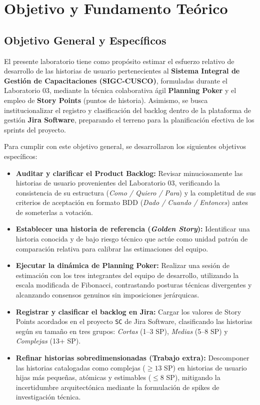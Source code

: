 \section{Objetivo y Fundamento Teórico}

\subsection{Objetivo General y Específicos}

El presente laboratorio tiene como propósito estimar el esfuerzo relativo de desarrollo de las historias de usuario pertenecientes al \textbf{Sistema Integral de Gestión de Capacitaciones (SIGC-CUSCO)}, formuladas durante el Laboratorio 03, mediante la técnica colaborativa ágil \textbf{Planning Poker} y el empleo de \textbf{Story Points} (puntos de historia). Asimismo, se busca institucionalizar el registro y clasificación del backlog dentro de la plataforma de gestión \textbf{Jira Software}, preparando el terreno para la planificación efectiva de los sprints del proyecto.

Para cumplir con este objetivo general, se desarrollaron los siguientes objetivos específicos:
\begin{itemize}
    \item \textbf{Auditar y clarificar el Product Backlog:} Revisar minuciosamente las historias de usuario provenientes del Laboratorio 03, verificando la consistencia de su estructura (\textit{Como / Quiero / Para}) y la completitud de sus criterios de aceptación en formato BDD (\textit{Dado / Cuando / Entonces}) antes de someterlas a votación.
    \item \textbf{Establecer una historia de referencia (\textit{Golden Story}):} Identificar una historia conocida y de bajo riesgo técnico que actúe como unidad patrón de comparación relativa para calibrar las estimaciones del equipo.
    \item \textbf{Ejecutar la dinámica de Planning Poker:} Realizar una sesión de estimación con los tres integrantes del equipo de desarrollo, utilizando la escala modificada de Fibonacci, contrastando posturas técnicas divergentes y alcanzando consensos genuinos sin imposiciones jerárquicas.
    \item \textbf{Registrar y clasificar el backlog en Jira:} Cargar los valores de Story Points acordados en el proyecto \texttt{SC} de Jira Software, clasificando las historias según su tamaño en tres grupos: \textit{Cortas} (1--3 SP), \textit{Medias} (5--8 SP) y \textit{Complejas} (13+ SP).
    \item \textbf{Refinar historias sobredimensionadas (Trabajo extra):} Descomponer las historias catalogadas como complejas ($\ge 13$ SP) en historias de usuario hijas más pequeñas, atómicas y estimables ($\le 8$ SP), mitigando la incertidumbre arquitectónica mediante la formulación de spikes de investigación técnica.
\end{itemize}

